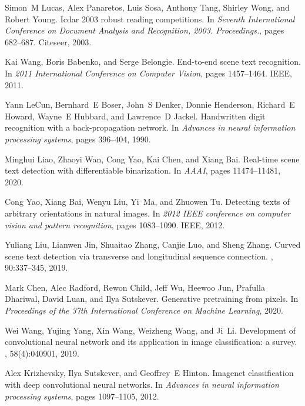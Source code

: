 \documentclass[review]{cvpr}
\begin{document}
{\begin{thebibliography}{10}
Simon~M Lucas, Alex Panaretos, Luis Sosa, Anthony Tang, Shirley Wong, and
  Robert Young.
\newblock Icdar 2003 robust reading competitions.
\newblock In {\em Seventh International Conference on Document Analysis and
  Recognition, 2003. Proceedings.}, pages 682--687. Citeseer, 2003.


Kai Wang, Boris Babenko, and Serge Belongie.
\newblock End-to-end scene text recognition.
\newblock In {\em 2011 International Conference on Computer Vision}, pages
  1457--1464. IEEE, 2011.



Yann LeCun, Bernhard~E Boser, John~S Denker, Donnie Henderson, Richard~E
  Howard, Wayne~E Hubbard, and Lawrence~D Jackel.
\newblock Handwritten digit recognition with a back-propagation network.
\newblock In {\em Advances in neural information processing systems}, pages
  396--404, 1990.


Minghui Liao, Zhaoyi Wan, Cong Yao, Kai Chen, and Xiang Bai.
\newblock Real-time scene text detection with differentiable binarization.
\newblock In {\em AAAI}, pages 11474--11481, 2020.


Cong Yao, Xiang Bai, Wenyu Liu, Yi~Ma, and Zhuowen Tu.
\newblock Detecting texts of arbitrary orientations in natural images.
\newblock In {\em 2012 IEEE conference on computer vision and pattern
  recognition}, pages 1083--1090. IEEE, 2012.

Yuliang Liu, Lianwen Jin, Shuaitao Zhang, Canjie Luo, and Sheng Zhang.
\newblock Curved scene text detection via transverse and longitudinal sequence
  connection.
, 90:337--345, 2019.


Mark Chen, Alec Radford, Rewon Child, Jeff Wu, Heewoo Jun, Prafulla Dhariwal,
  David Luan, and Ilya Sutskever.
\newblock Generative pretraining from pixels.
\newblock In {\em Proceedings of the 37th International Conference on Machine
  Learning}, 2020.



Wei Wang, Yujing Yang, Xin Wang, Weizheng Wang, and Ji~Li.
\newblock Development of convolutional neural network and its application in
  image classification: a survey.
, 58(4):040901, 2019.

Alex Krizhevsky, Ilya Sutskever, and Geoffrey~E Hinton.
\newblock Imagenet classification with deep convolutional neural networks.
\newblock In {\em Advances in neural information processing systems}, pages
  1097--1105, 2012.



\end{thebibliography}}
\end{document}
